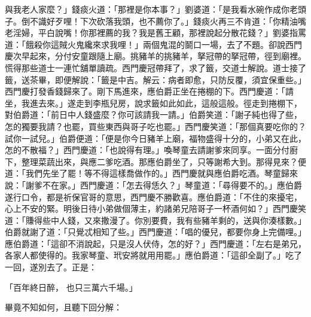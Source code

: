 \begin{showcontents}{}
與我老人家麼？」錢痰火道：「那裡是你本事？」劉婆道：「是我看水碗作成你老頭子。倒不識好歹哩！下次砍落我頭，也不薦你了。」錢痰火再三不肯道：「你精油嘴老淫婦，平白說嘴！你那裡薦的我？我是舊王顧，那裡說起分散花錢？」劉婆指罵道：「餓殺你這賊火鬼纔來求我哩！」兩個鬼混的鬬口一場，去了不題。卻說西門慶次早起來，分付安童跟隨上廟。挑豬羊的挑豬羊，拏冠帶的拏冠帶，徑到廟裡。慌得那些道士一連忙舖單讀疏。西門慶冠帶拜了，求了籤，交道士解說。道士接了籤，送茶畢，即便解說：「籤是中吉。解云：病者即愈，只防反覆，須宜保重些。」西門慶打發香錢歸來了。剛下馬進來，應伯爵正坐在捲棚的下。西門慶道：「請坐，我進去來。」遂走到李瓶兒房，說求籤如此如此，這般這般。徑走到捲棚下，對伯爵道：「前日中人錢盛麼？你可該請我一請。」伯爵笑道：「謝子純也得了些，怎的獨要我請？也罷，買些東西與哥子吃也罷。」西門慶笑道：「那個真要吃你的？試你一試兒。」伯爵便道：「便是你今日豬羊上廟，福物盛得十分的，小弟又在此，怎的不散福？」西門慶道：「也說得有理。」喚琴童去請謝爹來同享。一面分付廚下，整理菜蔬出來，與應二爹吃酒。那應伯爵坐了，只等謝希大到。那得見來？便道：「我們先坐了罷！等不得這樣喬做作的。」西門慶就與應伯爵吃酒。琴童歸來說：「謝爹不在家。」西門慶道：「怎去得恁久？」琴童道：「尋得要不的。」應伯爵遂行口令，都是祈保官哥的意思，西門慶不勝歡喜。應伯爵道：「不住的來擾宅，心上不安的緊。明後日待小弟做個薄主，約諸弟兄陪哥子一杯酒何如？」西門慶笑道：「賺得些中人錢，又來撒漫了。你別要費，我有些豬羊剩的，送與你湊樣數。」伯爵就謝了道：「只覺忒相知了些。」西門慶道：「唱的優兒，都要你身上完備哩。」應伯爵道：「這卻不消說起，只是沒人伏侍，怎的好？」西門慶道：「左右是弟兄，各家人都使得的。我家琴童、玳安將就用用罷。」應伯爵道：「這卻全副了。」吃了一回，遂別去了。正是：

「百年終日醉，  也只三萬六千場。」

畢竟不知如何，且聽下回分解：




\end{showcontents}


